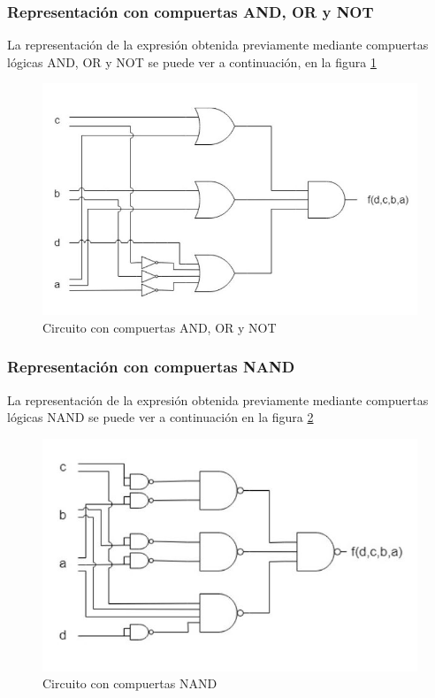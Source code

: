 \subsubsection{Representaci\'on con compuertas AND, OR y NOT}
\noindent
La representaci\'on de la expresi\'on obtenida previamente mediante compuertas l\'ogicas AND, OR y NOT se puede ver a continuaci\'on, en la figura \ref{fig:ej2b}

\begin{figure}[H]
    \centering
    \includegraphics[scale=0.55]{images/ej2/circuito1_ej2_parteb.JPG}
    \caption{Circuito con compuertas AND, OR y NOT}
    \label{fig:ej2b}
\end{figure}

\subsubsection{Representaci\'on con compuertas NAND}
\noindent
La representaci\'on de la expresi\'on obtenida previamente mediante compuertas l\'ogicas NAND se puede ver a continuaci\'on en la figura \ref{fig:ej2bnand}

\begin{figure}[H]
    \centering
    \includegraphics[scale=0.7]{images/ej2/circuito2_ej2_parteb.JPG}
    \caption{Circuito con compuertas NAND}
    \label{fig:ej2bnand}
\end{figure}
